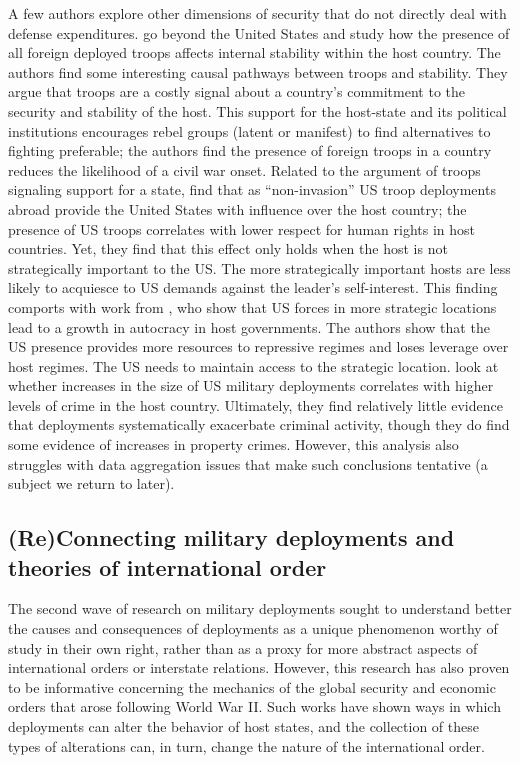 A few authors explore other dimensions of security that do not directly deal with defense expenditures.  go beyond the United States and study how the presence of all foreign deployed troops affects internal stability within the host country. The authors find some interesting causal pathways between troops and stability. They argue that troops are a costly signal about a country's commitment to the security and stability of the host. This support for the host-state and its political institutions encourages rebel groups (latent or manifest) to find alternatives to fighting preferable; the authors find the presence of foreign troops in a country reduces the likelihood of a civil war onset. Related to the argument of troops signaling support for a state,  find that as ``non-invasion'' US troop deployments abroad provide the United States with influence over the host country; the presence of US troops correlates with lower respect for human rights in host countries. Yet, they find that this effect only holds when the host is not strategically important to the US. The more strategically important hosts are less likely to acquiesce to US demands against the leader's self-interest. This finding comports with work from , who show that US forces in more strategic locations lead to a growth in autocracy in host governments. The authors show that the US presence provides more resources to repressive regimes and loses leverage over host regimes. The US needs to maintain access to the strategic location.  look at whether increases in the size of US military deployments correlates with higher levels of crime in the host country. Ultimately, they find relatively little evidence that deployments systematically exacerbate criminal activity, though they do find some evidence of increases in property crimes. However, this analysis also struggles with data aggregation issues that make such conclusions tentative (a subject we return to later).


\subsection*{(Re)Connecting military deployments and theories of international order}

The second wave of research on military deployments sought to understand better the causes and consequences of deployments as a unique phenomenon worthy of study in their own right, rather than as a proxy for more abstract aspects of international orders or interstate relations. However, this research has also proven to be informative concerning the mechanics of the global security and economic orders that arose following World War II. Such works have shown ways in which deployments can alter the behavior of host states, and the collection of these types of alterations can, in turn, change the nature of the international order. 

